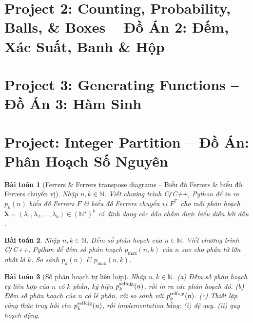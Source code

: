 \documentclass{article}
\newtheorem{baitoan}{Bài toán}
\begin{document}

\section{Project 2: Counting, Probability, Balls, \& Boxes -- Đồ Án 2: Đếm, Xác Suất, Banh \& Hộp}


\section{Project 3: Generating Functions -- Đồ Án 3: Hàm Sinh}

\section{Project: Integer Partition -- Đồ Án: Phân Hoạch Số Nguyên}

\begin{baitoan}[Ferrers \& Ferrers transpose diagrams -- Biểu đồ Ferrers \& biểu đồ Ferrers chuyển vị]
    Nhập $n,k\in\mathbb{N}$. Viết chương trình {\sf C{\tt/}C++, Python} để in ra $p_k(n)$ biểu đồ Ferrers $F$ \& biểu đồ Ferrers chuyển vị $F^\top$ cho mỗi phân hoạch $\boldsymbol{\lambda} = (\lambda_1,\lambda_2,\ldots,\lambda_k)\in(\mathbb{N}^\star)^k$ có định dạng các dấu chấm được biểu diễn bởi dấu {\tt*}.
\end{baitoan}

\begin{baitoan}
    Nhập $n,k\in\mathbb{N}$. Đếm số phân hoạch của $n\in\mathbb{N}$. Viết chương trình {\sf C{\tt/}C++, Python} để đếm số phân hoạch $p_{\max}(n,k)$ của $n$ sao cho phần tử lớn nhất là $k$. So sánh $p_k(n)$ \& $p_{\max}(n,k)$.
\end{baitoan}

\begin{baitoan}[Số phân hoạch tự liên hợp]
    Nhập $n,k\in\mathbb{N}$. (a) Đếm số phân hoạch tự liên hợp của $n$ có $k$ phần, ký hiệu $p_k^{\rm selfcjg}(n)$, rồi in ra các phân hoạch đó. (b) Đếm số phân hoạch của $n$ có lẻ phần, rồi so sánh với $p_k^{\rm selfcjg}(n)$. (c) Thiết lập công thức truy hồi cho $p_k^{\rm selfcjg}(n)$, rồi implementation bằng: (i) đệ quy. (ii) quy hoạch động.
\end{baitoan}
\end{document}
